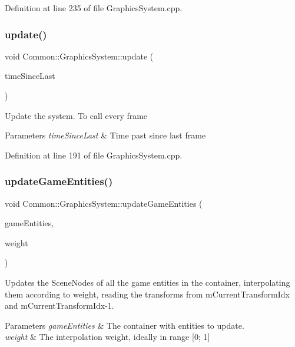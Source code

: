 Definition at line 235 of file Graphics\+System.\+cpp.

\mbox{\label{class_common_1_1_graphics_system_ab2c01af1a20132c37964f34f7dfb645c}} 
\subsubsection{\texorpdfstring{update()}{update()}}
{\footnotesize\ttfamily void Common\+::\+Graphics\+System\+::update (\begin{DoxyParamCaption}\item[{float}]{time\+Since\+Last }\end{DoxyParamCaption})}

Update the system. To call every frame 
\begin{DoxyParams}{Parameters}
{\em time\+Since\+Last} & Time past since last frame \\
\hline
\end{DoxyParams}


Definition at line 191 of file Graphics\+System.\+cpp.

\mbox{\label{class_common_1_1_graphics_system_a9cabbf2ae25610cfa006d45a95f77d6a}} 
\subsubsection{\texorpdfstring{update\+Game\+Entities()}{updateGameEntities()}}
{\footnotesize\ttfamily void Common\+::\+Graphics\+System\+::update\+Game\+Entities (\begin{DoxyParamCaption}\item[{const Game\+Entity\+Vec \&}]{game\+Entities,  }\item[{float}]{weight }\end{DoxyParamCaption})}

Updates the Scene\+Nodes of all the game entities in the container, interpolating them according to weight, reading the transforms from m\+Current\+Transform\+Idx and m\+Current\+Transform\+Idx-\/1. 
\begin{DoxyParams}{Parameters}
{\em game\+Entities} & The container with entities to update. \\
\hline
{\em weight} & The interpolation weight, ideally in range \mbox{[}0; 1\mbox{]} \\
\hline
\end{DoxyParams}


